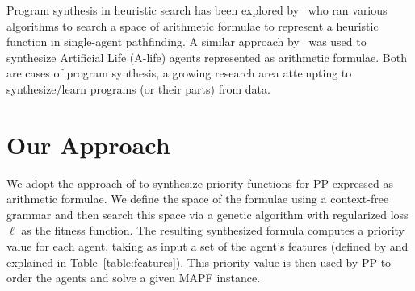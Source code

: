 Program synthesis in heuristic search has been explored by~\citet{cog2020,bulitko2021fast,sergio2021,bulitko2portability} who ran various algorithms to search a space of arithmetic formulae to represent a heuristic function in single-agent pathfinding. A similar approach by~\citet{acs2020} was used to synthesize Artificial Life (A-life) agents represented as arithmetic formulae. Both are cases of program synthesis, a growing research area attempting to synthesize/learn programs (or their parts) from data.

\section{Our Approach}
\label{ourApproach}

We adopt the approach of  to synthesize priority functions for PP expressed as arithmetic formulae. We define the space of the formulae using a context-free grammar and then search this space via a genetic algorithm with regularized loss $\ell$ as the fitness function.
The resulting synthesized formula computes a priority value for each agent, taking as input a set of the agent's features (defined by  and explained in Table~\ref{table:features}).
This priority value is then used by PP to order the agents and solve a given MAPF instance.

